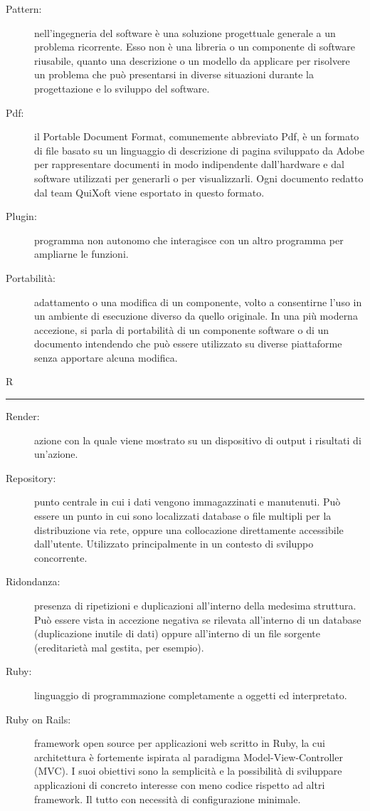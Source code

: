\documentclass[11pt,a4paper]{article}
\begin{document}
\begin{description}
	\item[Pattern:] nell'ingegneria del software è una soluzione progettuale generale a un problema ricorrente. Esso non è una libreria o un componente di software riusabile, quanto una descrizione o un modello da applicare per risolvere un problema che può presentarsi in diverse situazioni durante la progettazione e lo sviluppo del software.
	\item[Pdf:] il Portable Document Format, comunemente abbreviato Pdf, è un formato di file basato su un linguaggio di descrizione di pagina sviluppato da Adobe per rappresentare documenti in modo indipendente dall'hardware e dal software utilizzati per generarli o per visualizzarli. Ogni documento redatto dal team QuiXoft viene esportato in questo formato.
	\item[Plugin:] programma non autonomo che interagisce con un altro programma per ampliarne le funzioni.
	\item[Portabilità:] adattamento o una modifica di un componente, volto a consentirne l'uso in un ambiente di esecuzione diverso da quello originale. In una più moderna accezione, si parla di portabilità di un componente software o di un documento intendendo che può essere utilizzato su diverse piattaforme senza apportare alcuna modifica.
\end{description}
\bigskip
\Huge R \bigskip
\hrule
\smallskip
\normalsize
\begin{description}
	\item[Render:] azione con la quale viene mostrato su un dispositivo di output i risultati di un'azione.
	\item[Repository:] punto centrale in cui i dati vengono immagazzinati e manutenuti. Può essere un punto in cui sono localizzati database o file multipli per la distribuzione via rete, oppure una collocazione direttamente accessibile dall'utente. Utilizzato principalmente in un contesto di sviluppo concorrente.
	\item[Ridondanza:] presenza di ripetizioni e duplicazioni all'interno della medesima struttura. Può essere vista in accezione negativa se rilevata all'interno di un database (duplicazione inutile di dati) oppure all'interno di un file sorgente (ereditarietà mal gestita, per esempio).
	\item[Ruby:] linguaggio di programmazione completamente a oggetti ed interpretato.
	\item[Ruby on Rails:] framework open source per applicazioni web scritto in Ruby, la cui architettura è fortemente ispirata al paradigma Model-View-Controller (MVC). I suoi obiettivi sono la semplicità e la possibilità di sviluppare applicazioni di concreto interesse con meno codice rispetto ad altri framework. Il tutto con necessità di configurazione minimale.
\end{description}
\end{document}

